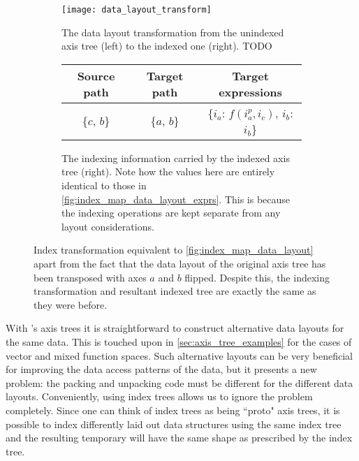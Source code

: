 \documentclass[thesis]{subfiles}
\begin{document}
\begin{figure}[h]
  \centering
  \begin{subfigure}{\textwidth}
    \centering
    \texttt{[image: data\_layout\_transform]}
    \caption{
      The data layout transformation from the unindexed axis tree (left) to the indexed one (right).
      TODO
    }
    \label{fig:data_layout_transform}
  \end{subfigure}

  \vspace{1em}

  \begin{subfigure}{\textwidth}
    \centering
    \begin{tabular}{|c|c|c|}
      \hline
      \textbf{Source path} & \textbf{Target path} & \textbf{Target expressions} \\
      \hline
      \{$c$, $b$\} & \{$a$, $b$\} & \{$i_a$: $f(i^p_a, i_c)$, $i_b$: $i_b$\} \\
      \hline
    \end{tabular}
    \caption{
      The indexing information carried by the indexed axis tree (right).
      Note how the values here are entirely identical to those in \cref{fig:index_map_data_layout_exprs}.
      This is because the indexing operations are kept separate from any layout considerations.
    }
    \label{fig:data_layout_transform_exprs}
  \end{subfigure}

  \caption{
    Index transformation equivalent to \cref{fig:index_map_data_layout} apart from the fact that the data layout of the original axis tree has been transposed with axes $a$ and $b$ flipped.
    Despite this, the indexing transformation and resultant indexed tree are exactly the same as they were before.
  }
  \label{fig:data_layout_transform_all}
\end{figure}

With 's axis trees it is straightforward to construct alternative data layouts for the same data.
This is touched upon in \cref{sec:axis_tree_examples} for the cases of vector and mixed function spaces.
Such alternative layouts can be very beneficial for improving the data access patterns of the data, but it presents a new problem: the packing and unpacking code must be different for the different data layouts.
Conveniently, using index trees allows us to ignore the problem completely.
Since one can think of index trees as being ``proto" axis trees, it is possible to index differently laid out data structures using the same index tree and the resulting temporary will have the same shape as prescribed by the index tree.
\end{document}
